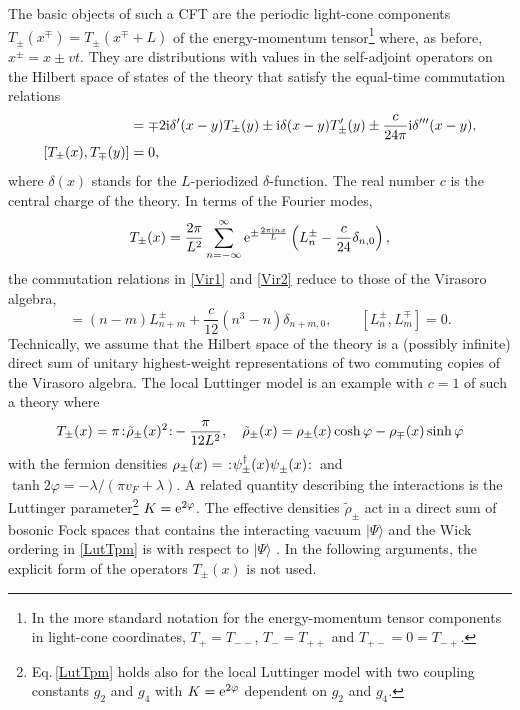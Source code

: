 \documentclass[12pt,a4paper]{article}
\newcommand{\ee}{{\rm e}}
\newcommand{\ii}{{\rm i}}
\newcommand{\pdag}{^{\vphantom{\dagger}}}
\newcommand{\wick}[1]{\left. :\! \hspace{-0.5pt} #1 \hspace{-0.5pt} \!: \right.}
\theoremstyle{definition}
\theoremstyle{remark}
\begin{document}
The basic objects of such a CFT are the periodic light-cone components $T_{\pm}(x^\mp)=T_{\pm}(x^\mp+L)$ of the energy-momentum tensor\footnote{In the 
more standard notation for the energy-momentum tensor components in
light-cone coordinates, $T_+=T_{--}$, $T_-=T_{++}$ and $T_{+-}=0=T_{-+}$.} where,
as before, $x^\pm = x \pm vt$.
They are distributions with values in the self-adjoint operators on the Hilbert space of states of the theory that satisfy the equal-time commutation relations
%
\begin{align}
[T_{\pm}(x),T_{\pm}(y)]
&= \mp 2\ii \delta'(x-y)T_{\pm}(y) \pm \ii\delta(x-y) T_{\pm}'(y)
\pm \frac{c}{24\pi}\ii \delta'''(x-y),
\label{Vir1}\\
[T_{\pm}(x),T_{\mp}(y)]
&= 0,\label{Vir2}
\end{align}
%
where $\delta(x)$ stands for the $L$-periodized $\delta$-function. 
The real number $c$ is the central charge of the theory.
In terms of the Fourier modes,
%
\begin{equation}
T_{\pm}(x)
= \frac{2\pi}{L^2}\sum_{n=-\infty}^{\infty} \ee^{\pm\frac{2\pi\ii nx}{L}}
	\left( L^{\pm}_n - \frac{c}{24} \delta_{n,0} \right),
\end{equation}
%
the commutation relations in \eqref{Vir1} and \eqref{Vir2} reduce to those of
the Virasoro algebra,
%
\begin{equation}
[L^\pm_n,L^\pm_m] = (n-m)L^\pm_{n+m}+\frac{c}{12}(n^3-n)\delta_{n+m,0},\qquad
[L^\pm_n,L^\mp_m] = 0.
\end{equation}
%
Technically, we assume that the Hilbert space of the theory is a (possibly infinite) direct sum of unitary highest-weight representations of two commuting copies of the Virasoro algebra.
The local Luttinger model is an example with $c=1$ of such a theory where
%
\begin{equation}
\label{LutTpm}
T_{\pm}(x) = \pi \! \wick{ \tilde{\rho}_{\pm}(x)^2 } \! - \frac{\pi}{12L^2},
\quad
\tilde{\rho}_{\pm}(x) = \rho_{\pm}(x) \cosh\varphi - \rho_{\mp}(x) \sinh\varphi  
\end{equation}
%
with the fermion densities $\rho_{\pm}(x) = \wick{ \psi^\dag_{\pm}(x) \psi\pdag_{\pm}(x) }$ and $\tanh 2\varphi = -\lambda/(\pi v_F+\lambda)$.
A related quantity describing the interactions is the Luttinger parameter\footnote{Eq.\,\eqref{LutTpm} holds also for the local Luttinger model with two coupling
constants $g_2$ and $g_4$ \cite{Voit} with $K=\ee^{2\varphi}$ dependent
on $g_2$ and $g_4$.}
$K = \ee^{2\varphi}$.
The effective densities $\tilde{\rho}_{\pm}$ act in a direct sum of bosonic Fock spaces that contains the interacting vacuum $|\Psi\rangle$ and the Wick ordering in \eqref{LutTpm} is with respect to $|\Psi\rangle$ \cite{ML,LaMo}.
In the following arguments, the explicit form of the operators $T_{\pm}(x)$ is not used. 
\end{document}
